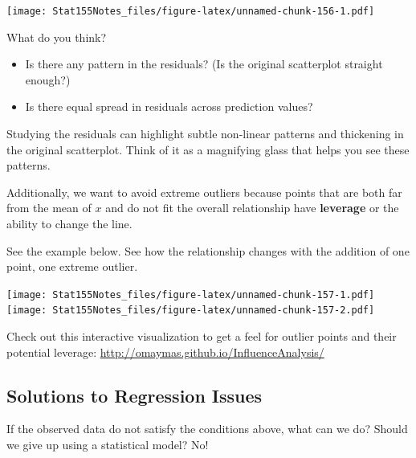 \documentclass[]{book}
\providecommand{\tightlist}{%
  \setlength{\itemsep}{0pt}\setlength{\parskip}{0pt}}
\begin{document}
\texttt{[image: Stat155Notes\_files/figure-latex/unnamed-chunk-156-1.pdf]}

What do you think?

\begin{itemize}
\tightlist
\item
  Is there any pattern in the residuals? (Is the original scatterplot straight enough?)
\item
  Is there equal spread in residuals across prediction values?
\end{itemize}

Studying the residuals can highlight subtle non-linear patterns and thickening in the original scatterplot. Think of it as a magnifying glass that helps you see these patterns.

Additionally, we want to avoid extreme outliers because points that are both far from the mean of \(x\) and do not fit the overall relationship have \textbf{leverage} or the ability to change the line.

See the example below. See how the relationship changes with the addition of one point, one extreme outlier.

\texttt{[image: Stat155Notes\_files/figure-latex/unnamed-chunk-157-1.pdf]} \texttt{[image: Stat155Notes\_files/figure-latex/unnamed-chunk-157-2.pdf]}

Check out this interactive visualization to get a feel for outlier points and their potential leverage: \url{http://omaymas.github.io/InfluenceAnalysis/}

\hypertarget{solutions-to-regression-issues}{%
\subsection{Solutions to Regression Issues}\label{solutions-to-regression-issues}}

If the observed data do not satisfy the conditions above, what can we do? Should we give up using a statistical model? No!
\end{document}
